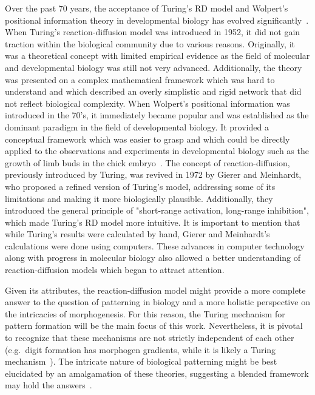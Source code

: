 Over the past 70 years, the acceptance of Turing's \acrfull{RD} model and Wolpert's positional information theory in developmental biology has evolved significantly~\parencite{green2015positional}.
When Turing's reaction-diffusion model was introduced in 1952, it did not gain traction within the biological community due to various reasons.
Originally, it was a theoretical concept with limited empirical evidence as the field of molecular and developmental biology was still not very advanced.
Additionally, the theory was presented on a complex mathematical framework which was hard to understand and which described an overly simplistic and rigid network that did not reflect biological complexity.
When Wolpert's positional information was introduced in the 70's, it immediately became popular and was established as the dominant paradigm in the field of developmental biology.
It provided a conceptual framework which was easier to grasp and which could be directly applied to the observations and experiments in developmental biology such as the growth of limb buds in the chick embryo~\parencite{saunders1968ectodermal}.
The concept of reaction-diffusion, previously introduced by Turing, was revived in 1972 by Gierer and Meinhardt, who proposed a refined version of Turing's model, addressing some of its limitations and making it more biologically plausible.
Additionally, they introduced the general principle of "short-range activation, long-range inhibition", which made Turing's RD model more intuitive.
It is important to mention that while Turing's results were calculated by hand, Gierer and Meinhardt's calculations were done using computers.
These advances in computer technology along with progress in molecular biology also allowed a better understanding of reaction-diffusion models which began to attract attention.

Given its attributes, the reaction-diffusion model might provide a more complete answer to the question of patterning in biology and a more holistic perspective on the intricacies of morphogenesis.
For this reason, the Turing mechanism for pattern formation will be the main focus of this work.
Nevertheless, it is pivotal to recognize that these mechanisms are not strictly independent of each other (e.g.~digit formation has morphogen gradients, while it is likely a Turing mechanism~\parencite{Raspopovic1}).
The intricate nature of biological patterning might be best elucidated by an amalgamation of these theories, suggesting a blended framework may hold the answers~\parencite{Green2015}.

